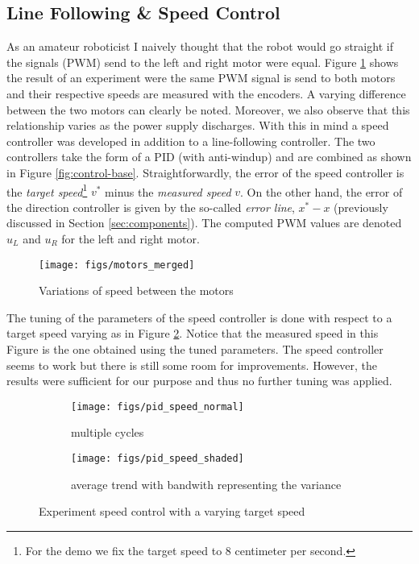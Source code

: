 \documentclass[12pt]{report}
\begin{document}
\subsection*{Line Following \& Speed Control}\label{sec:line-control}
As an amateur roboticist I naively thought that the robot would go straight if the signals (PWM) send to the left and right motor were equal. Figure \ref{fig:probs-control} shows the result of an experiment were the same PWM signal is send to both motors and their respective speeds are measured with the encoders. A varying difference between the two motors can clearly be noted. Moreover, we also observe that this relationship varies as the power supply discharges. With this in  mind a speed controller was developed in addition to a line-following controller. The two controllers take the form of a PID (with anti-windup) and are combined as shown in Figure \ref{fig:control-base}. Straightforwardly, the error of the speed controller is the \textit{target speed}\footnote{For the demo we fix the target speed to 8 centimeter per second.} $v^*$ minus the \textit{measured speed} $v$. On the other hand, the error of the direction controller is given by the so-called \textit{error line}, $x^*-x$ (previously discussed in Section \ref{sec:components}). The computed PWM values are denoted $u_L$ and $u_R$ for the left and right motor.
\begin{figure}[!h]
  \centering
  \texttt{[image: figs/motors\_merged]}
\caption{Variations of speed between the motors}
\label{fig:probs-control}
\end{figure}

The tuning of the parameters of the speed controller is done with respect to a target speed varying as in Figure \ref{fig:tuning}. Notice that the measured speed in this Figure is the one obtained using the tuned parameters. The speed controller seems to work but there is still some room for improvements. However, the results were sufficient for our purpose and thus no further tuning was applied. 
\begin{figure}[!h]
\centering
\begin{subfigure}{.5\textwidth}
  \centering
  \texttt{[image: figs/pid\_speed\_normal]}
  \caption{multiple cycles}
\end{subfigure}%
\begin{subfigure}{.5\textwidth}
  \centering
  \texttt{[image: figs/pid\_speed\_shaded]}
  \caption{average trend with bandwith representing the variance}
\end{subfigure}
\caption{Experiment speed control with a varying target speed}
\label{fig:tuning}
\end{figure}
\end{document}
